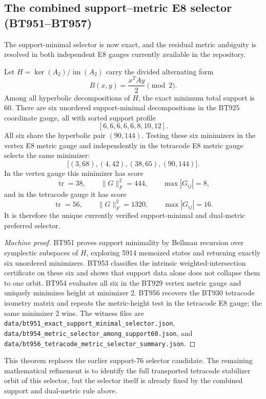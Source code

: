 
\subsection{The combined support--metric E8 selector (BT951--BT957)}\label{subsec:bt957-final-e8-selector}

The support-minimal selector is now exact, and the residual metric ambiguity is
resolved in both independent E8 gauges currently available in the repository.

\begin{theorem}
Let \(H=\ker(A_2)/\operatorname{im}(A_2)\) carry the divided alternating form
\[
  B(x,y)=\frac{x^T A y}{2}\pmod 2.
\]
Among all hyperbolic decompositions of \(H\), the exact minimum total support is
\(60\).  There are six unordered support-minimal decompositions in the BT925
coordinate gauge, all with sorted support profile
\[
  [6,6,6,6,6,8,10,12].
\]
All six share the hyperbolic pair \((90,144)\).  Testing these six minimizers in
the vertex E8 metric gauge and independently in the tetracode E8 metric gauge
selects the same minimizer:
\[
  \boxed{\bigl[(3,68),(4,42),(38,65),(90,144)\bigr].}
\]
In the vertex gauge this minimizer has score
\[
  \operatorname{tr}=38,\qquad \|G\|_F^2=444,\qquad \max |G_{ij}|=8,
\]
and in the tetracode gauge it has score
\[
  \operatorname{tr}=56,\qquad \|G\|_F^2=1320,\qquad \max |G_{ij}|=16.
\]
It is therefore the unique currently verified support-minimal and dual-metric
preferred selector.
\end{theorem}

\begin{proof}[Machine proof]
BT951 proves support minimality by Bellman recursion over symplectic subspaces of
\(H\), exploring 5914 memoized states and returning exactly six unordered
minimizers.  BT953 classifies the intrinsic weighted-intersection certificate on
these six and shows that support data alone does not collapse them to one orbit.
BT954 evaluates all six in the BT929 vertex metric gauge and uniquely minimizes
height at minimizer 2.  BT956 recovers the BT930 tetracode isometry matrix and
repeats the metric-height test in the tetracode E8 gauge; the same minimizer 2
wins.  The witness files are
\texttt{data/bt951\_exact\_support\_minimal\_selector.json},
\texttt{data/bt954\_metric\_selector\_among\_support60.json}, and
\texttt{data/bt956\_tetracode\_metric\_selector\_summary.json}.
\end{proof}

This theorem replaces the earlier support-76 selector candidate.  The remaining
mathematical refinement is to identify the full transported tetracode stabilizer
orbit of this selector, but the selector itself is already fixed by the combined
support and dual-metric rule above.
